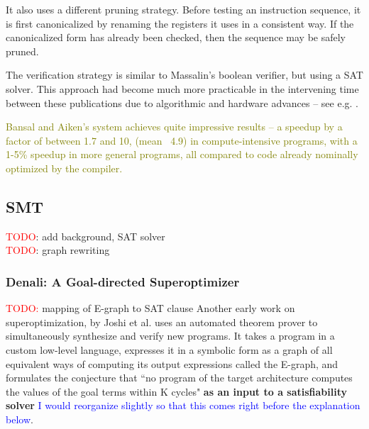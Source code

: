 \documentclass[12pt,twoside]{reedthesis}
\newcommand{\red}[1]{\textcolor{red}{#1}}
\newcommand{\green}[1]{\textcolor{olive}{#1}}
\newcommand{\comment}[2]{\textbf{#1} \textcolor{blue}{#2}}
\newcommand{\addressed}[2]{{#1}}
\begin{document}
            It also uses a different pruning strategy.
            Before testing an instruction sequence, it is first canonicalized by renaming the registers it uses in a consistent way.
            If the canonicalized form has already been checked, then the sequence may be safely pruned.
            
            The verification strategy is similar to Massalin's boolean verifier, but using a SAT solver.
            This approach had become much more practicable in the intervening time between these publications due to algorithmic and hardware advances -- see e.g. \cite{silva1996grasp}.
            
            \green{ %
            Bansal and Aiken's system achieves quite impressive results -- a speedup by a factor of between 1.7 and 10, (mean ~4.9) in compute-intensive programs, with a 1-5\% speedup in more general programs, all compared to code already nominally optimized by the compiler.
            }

    \subsection{SMT}
        \red{TODO}: add background, SAT solver
    \\  \red{TODO}: graph rewriting
        
        \subsubsection{Denali: A Goal-directed Superoptimizer}
            \red{TODO:} mapping of E-graph to SAT clause
            Another early work on superoptimization, by Joshi et al. \cite{joshi2002denali} uses an automated theorem prover to simultaneously synthesize and verify new programs.
            It takes a program in a custom low-level language, expresses it in a symbolic form as a graph of all equivalent ways of computing its output expressions
                \addressed{called the E-graph}{I would be inclined to have a separate description of E-graphs, but it depends on the structure of the section},
                and formulates the conjecture that ``no program of the target architecture computes the values of the goal terms within K cycles"
                    \comment{as an input to a satisfiability solver}{I would reorganize slightly so that this comes right before the explanation below}. 
                
\end{document}
